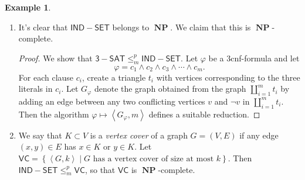 \documentclass[10pt,letterpaper,cm]{nupset}
\theoremstyle{definition}
\newtheorem{exmp}[definition]{Example}
\theoremstyle{theorem}
\theoremstyle{remark}
\newcommand{\1}{\mathbf{1}}
\newcommand{\0}{\vec 0}
\DeclareMathOperator{\NP}{\mathbf{NP}}
\begin{document}
\begin{exmp}
\begin{enumerate}
\begin{proof}
Let $g_1, \ldots, g_n$ and $x_1, \ldots, x_m$ denote  the Boolean values given by the edges and inputs of $C$, respectively. Relabel $g_1, \ldots, g_n, x_1, \ldots, x_m$ as $w_1, \ldots, w_{n+m}$. Let $\varphi$ be the 3cnf formula in the variables $w_1, \ldots, w_{n+m}$ where each clause of $\varphi$ corresponds either to $C$'s output value $w_s \vee w_s \vee w_s$ or to one of $C$'s internal edges. In the latter case, we can give the following descriptions.
\begin{itemize}
\item  If $w_j = \neg w_i$, then $\varphi$ contains exactly one clause of the form $$  \left(w_i \vee w_j\right) \land \left(\neg w_i \vee \neg w_j\right).
$$
\item If $w_h = w_i \land w_j$ in $C$, then $\varphi$ contains exactly one clause of the form $$  \left(w_i \vee w_j \vee \neg w_h\right) \land \left(w_i \vee \neg w_j \vee \neg w_h\right) \land \left(\neg w_i \vee w_j \vee \neg w_h\right) \land \left(\neg w_i \vee \neg w_j \vee w_h\right).$$
\item If $w_h = w_i \vee w_j$ in $C$, then $\varphi$ contains exactly one clause of the form $$ \left(w_i \vee w_j \vee \neg w_h\right) \land \left(w_i \vee \neg w_j \vee w_h\right) \land \left(\neg w_i \vee w_j \vee w_h\right) \land \left(\neg w_i \vee \neg w_j \vee w_h\right)
.$$
\end{itemize} By construction, $\varphi$ is satisfiable if and only if $C$ is. The algorithm $M: \left\langle C \right\rangle \mapsto \varphi$ is linear in $n^k$, hence efficient. Therefore, it is a suitable reduction. 
\end{proof}
\item  It's clear that $\mathsf{IND{-}SET}$ belongs to $\NP$. We claim that this is $\NP$-complete.
\begin{proof}
We show that $\mathsf{3{-}SAT} \leq_m^p \mathsf{IND{-}SET}$.  Let $\varphi$ be a 3cnf-formula and let $$\varphi = c_1 \land c_2 \land c_3 \land \cdots \land c_m.$$ For each clause $c_i$, create a triangle $t_i$ with vertices corresponding to the three literals in $c_i$. Let $G_{\varphi}$ denote the graph obtained from the graph $\coprod_{i=1}^m t_i$ by adding an edge between any two conflicting vertices $v$ and $\neg v$ in $\coprod_{i=1}^m t_i$. Then the algorithm $\varphi \mapsto \left\langle G_{\varphi}, m\right\rangle$ defines a suitable reduction. 
\end{proof}
\item We say that $K \subset V$ is a \textit{vertex cover} of a graph $G=\left(V, E\right)$ if any edge $\left(x,y\right) \in E$ has $x\in K$ or $y\in K$. Let $\mathsf{VC}= \left\{ \left\langle G, k\right\rangle \mid G\text{ has a vertex cover of size at most }k\right\}$. Then $\mathsf{IND{-}SET} \leq_m^p \mathsf{VC}$, so that $\mathsf{VC}$ is $\NP$-complete.  

\end{enumerate}
\end{exmp}
\end{document}
